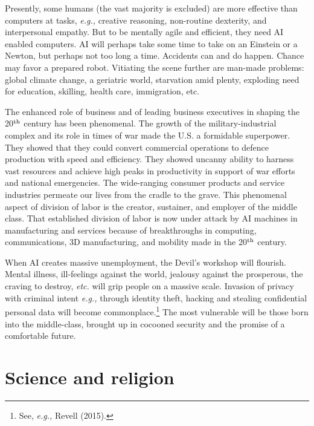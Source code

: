 \begin{multicols}{2}
Presently, some humans (the vast majority is excluded) are more effective than computers at tasks, \textit{e.g.,} creative reasoning, non-routine dexterity, and interpersonal empathy. But to be mentally agile and efficient, they need AI enabled computers. AI will perhaps take some time to take on an Einstein or a Newton, but perhaps not too long a time. Accidents can and do happen. Chance may favor a prepared robot. Vitiating the scene further are man-made problems: global climate change, a geriatric world, starvation amid plenty, exploding need for education, skilling, health care, immigration, etc. 

The enhanced role of business and of leading business executives in shaping the 20$^{\rm th}$ century has been phenomenal. The growth of the military-industrial complex and its role in times of war made the U.S. a formidable superpower. They showed that they could convert commercial operations to defence production with speed and efficiency. They showed uncanny ability to harness vast resources and achieve high peaks in productivity in support of war efforts and national emergencies. The wide-ranging consumer products and service industries permeate our lives from the cradle to the grave. This phenomenal aspect of division of labor is the creator, sustainer, and employer of the middle class. That established division of labor is now under attack by AI machines in manufacturing and services because of breakthroughs in computing, communications, 3D manufacturing, and mobility made in the 20$^{\rm th}$ century.

When AI creates massive unemployment, the Devil's workshop will flourish. Mental illness, ill-feelings against the world, jealousy against the prosperous, the craving to destroy, \textit{etc.} will grip people on a massive scale. Invasion of privacy with criminal intent \textit{e.g.,} through identity theft, hacking and stealing confidential personal data will become commonplace.\footnote{See, \textit{e.g.,} Revell (2015).}  The most vulnerable will be those born into the middle-class, brought up in cocooned security and the promise of a comfortable future.\\[-20pt]

\section{Science and religion}

\vskip -4pt


\end{multicols}
